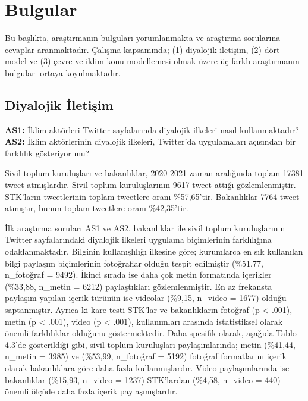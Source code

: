 \documentclass[
]{book}
\begin{document}
\hypertarget{bulgular}{%
\section{Bulgular}\label{bulgular}}

Bu başlıkta, araştırmanın bulguları yorumlanmakta ve araştırma sorularına cevaplar aranmaktadır. Çalışma kapsamında; (1) diyalojik iletişim, (2) dört-model ve (3) çevre ve iklim konu modellemesi olmak üzere üç farklı araştırmanın bulguları ortaya koyulmaktadır.

\hypertarget{diyalojik-iletiux15fim}{%
\subsection{Diyalojik İletişim}\label{diyalojik-iletiux15fim}}

\textbf{AS1:} İklim aktörleri Twitter sayfalarında diyalojik ilkeleri nasıl kullanmaktadır?
\textbf{AS2:} İklim aktörlerinin diyalojik ilkeleri, Twitter'da uygulamaları açısından bir farklılık gösteriyor mu?

Sivil toplum kuruluşları ve bakanlıklar, 2020-2021 zaman aralığında toplam 17381 tweet atmışlardır. Sivil toplum kuruluşlarının 9617 tweet attığı gözlemlenmiştir. STK'ların tweetlerinin toplam tweetlere oranı \%57,65'tir. Bakanlıklar 7764 tweet atmıştır, bunun toplam tweetlere oranı \%42,35'tir.

İlk araştırma soruları AS1 ve AS2, bakanlıklar ile sivil toplum kuruluşlarının Twitter sayfalarındaki diyalojik ilkeleri uygulama biçimlerinin farklılığına odaklanmaktadır.
Bilginin kullanışlılığı ilkesine göre; kurumlarca en sık kullanılan bilgi paylaşım biçimlerinin fotoğraflar olduğu tespit edilmiştir (\%51,77, n\_fotoğraf = 9492). İkinci sırada ise daha çok metin formatında içerikler (\%33,88, n\_metin = 6212) paylaştıkları gözlemlenmiştir. En az frekansta paylaşım yapılan içerik türünün ise videolar (\%9,15, n\_video = 1677) olduğu saptanmıştır. Ayrıca ki-kare testi STK'lar ve bakanlıkların fotoğraf (p \textless{} .001), metin (p \textless{} .001), video (p \textless{} .001), kullanımları arasında istatistiksel olarak önemli farklılıklar olduğunu göstermektedir. Daha spesifik olarak, aşağıda Tablo 4.3'de gösterildiği gibi, sivil toplum kuruluşları paylaşımlarında; metin (\%41,44, n\_metin = 3985) ve (\%53,99, n\_fotoğraf = 5192) fotoğraf formatlarını içerik olarak bakanlıklara göre daha fazla kullanmışlardır. Video paylaşımlarında ise bakanlıklar (\%15,93, n\_video = 1237) STK'lardan (\%4,58, n\_video = 440) önemli ölçüde daha fazla içerik paylaşmışlardır.
\end{document}
